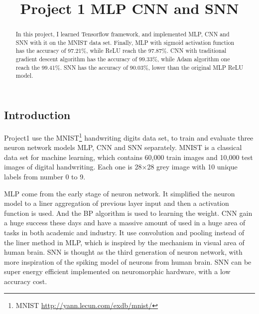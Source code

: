 \documentclass[10pt,twocolumn,letterpaper]{article}
\begin{document}
\begin{CJK}{UTF8}{gbsn}

\title{Project 1 MLP CNN and SNN}

\author{
}

\maketitle

\begin{abstract}
In this project, I learned Tensorflow framework, and implemented MLP, CNN and SNN with it on the MNIST data set. Finally, MLP with sigmoid activation function has the accuracy of 97.21\%, while ReLU reach the 97.87\%. CNN with traditional gradient descent algorithm has the accuracy of 99.33\%, while Adam algorithm one reach the 99.41\%. SNN has the accuracy of 90.03\%, lower than the original MLP ReLU model.
\end{abstract}

\section{Introduction}

Project1 use the MNIST\footnote {MNIST \url{http://yann.lecun.com/exdb/mnist/}}  handwriting digits data set, to train and evaluate three neuron network models MLP, CNN and SNN separately. MNIST is a classical data set for machine learning, which contains 60,000 train images and 10,000 test images of digital handwriting. Each one is 28×28 grey image with 10 unique labels from number 0 to 9.

MLP come from the early stage of neuron network. It simplified the neuron model to a liner aggregation of previous layer input and then a activation function is used. And the BP algorithm is used to learning the weight. CNN gain a huge success these days and have a massive amount of used in a huge area of tasks in both academic and industry. It use convolution and pooling instead of the liner method in MLP, which is inspired by the mechanism in visual area of human brain. SNN is thought as the third generation of neuron network, with more inspiration of the spiking model of neurons from human brain. SNN can be super energy efficient implemented on neuromorphic hardware, with a low accuracy cost. 


\end{CJK}
\end{document}
